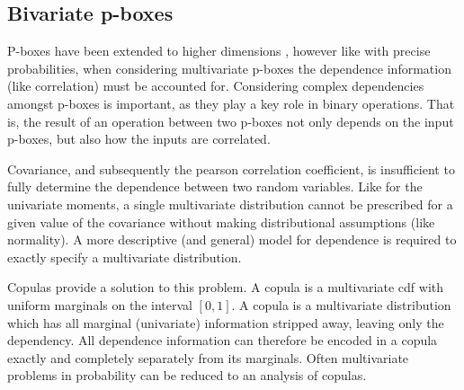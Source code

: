 \documentclass{juliacon}
\begin{document}

\subsection{Bivariate p-boxes}

P-boxes have been extended to higher dimensions \cite{montes2015sklar}, however like with precise probabilities, when considering multivariate p-boxes the dependence information (like correlation) must be accounted for. Considering complex dependencies amongst p-boxes is important, as they play a key role in binary operations. That is, the result of an operation between two p-boxes not only depends on the input p-boxes, but also how the inputs are correlated.

Covariance, and subsequently the pearson correlation coefficient, is insufficient to fully determine the dependence between two random variables. Like for the univariate moments, a single multivariate distribution cannot be prescribed for a given value of the covariance without making distributional assumptions (like normality). A more descriptive (and general) model for dependence is required to exactly specify a multivariate distribution.

Copulas \cite{nelsen2007introduction} provide a solution to this problem. A copula is a multivariate cdf with uniform marginals on the interval $[0, 1]$. A copula is a multivariate distribution which has all marginal (univariate) information stripped away, leaving only the dependency. All dependence information can therefore be encoded in a copula exactly and completely separately from its marginals. Often multivariate problems in probability can be reduced to an analysis of copulas.
\end{document}
